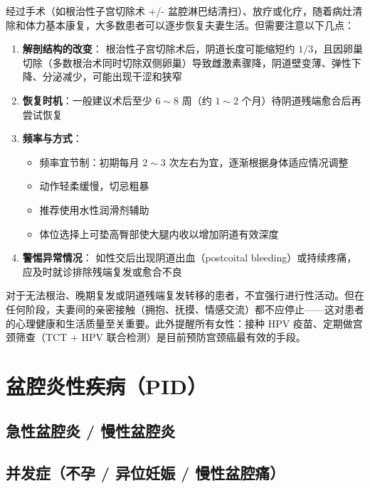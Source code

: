经过手术（如根治性子宫切除术 +/- 盆腔淋巴结清扫）、放疗或化疗，随着病灶清除和体力基本康复，大多数患者可以逐步恢复夫妻生活。但需要注意以下几点：

\begin{enumerate}
	\item \textbf{解剖结构的改变}：
	根治性子宫切除术后，阴道长度可能缩短约 $1/3$，且因卵巢切除（多数根治术同时切除双侧卵巢）导致雌激素骤降，阴道壁变薄、弹性下降、分泌减少，可能出现干涩和狭窄

	\item \textbf{恢复时机}：一般建议术后至少 $6\sim8$ 周（约 $1\sim2$ 个月）待阴道残端愈合后再尝试恢复

	\item \textbf{频率与方式}：
	\begin{itemize}
		\item 频率宜节制：初期每月 $2\sim3$ 次左右为宜，逐渐根据身体适应情况调整
		\item 动作轻柔缓慢，切忌粗暴
		\item 推荐使用水性润滑剂辅助
		\item 体位选择上可垫高臀部使大腿内收以增加阴道有效深度
	\end{itemize}

	\item \textbf{警惕异常情况}：
	如性交后出现阴道出血（postcoital bleeding）或持续疼痛，应及时就诊排除残端复发或愈合不良
\end{enumerate}

\begin{tcolorbox}[colback=pink!5!white,colframe=red!50!black,title=贴心小叮咛]
对于无法根治、晚期复发或阴道残端复发转移的患者，不宜强行进行性活动。但在任何阶段，夫妻间的亲密接触（拥抱、抚摸、情感交流）都不应停止——这对患者的心理健康和生活质量至关重要。此外提醒所有女性：接种 HPV 疫苗、定期做宫颈筛查（TCT + HPV 联合检测）是目前预防宫颈癌最有效的手段。
\end{tcolorbox}

\section{盆腔炎性疾病（PID）}
\subsection{急性盆腔炎 / 慢性盆腔炎}
\subsection{并发症（不孕 / 异位妊娠 / 慢性盆腔痛）}

